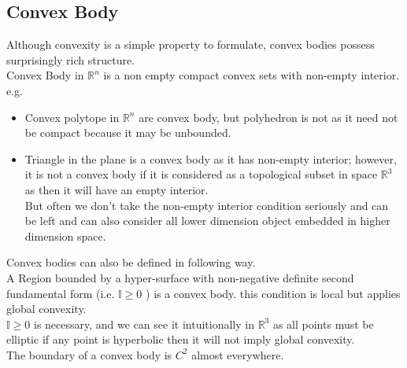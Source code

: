 \documentclass[oneside]{book}
\begin{document}
	\subsection{Convex Body}
	\label{ss:18}
	Although convexity is a simple property to formulate, convex bodies possess surprisingly rich structure. \\
	Convex Body in  $\mathbb{R}^n$  is a non empty compact convex sets with non-empty interior.
	e.g.
	\begin{itemize}
		\item
		
		Convex polytope in $\mathbb{R}^n$ are convex body, but polyhedron is not as it need not be compact because it may be unbounded.
		\item 
		Triangle in the plane is a convex body as it has non-empty interior; however, it is not a convex body if it is considered as a topological subset in space  $\mathbb{R}^3$ as then it will have an empty interior. 
		\\  
		But often we don't take the non-empty interior condition seriously and can be left and can also consider all lower dimension object embedded in higher dimension space.
		
		
	\end{itemize}
	
	Convex bodies can also be defined in following way.\\
	A Region  bounded by a hyper-surface with non-negative definite second fundamental form (i.e. $\mathbb{I} \geq 0 $ ) is a convex body. this condition is local but applies global convexity. \\
	$\mathbb{I} \geq 0 $ is necessary, and we can see it intuitionally in  $\mathbb{R}^3$ as all points must be elliptic if any point is hyperbolic then it will not imply global convexity. \\
	The boundary of a convex body is $C^{2}$ almost everywhere.   \\
	
	
	
\end{document}

